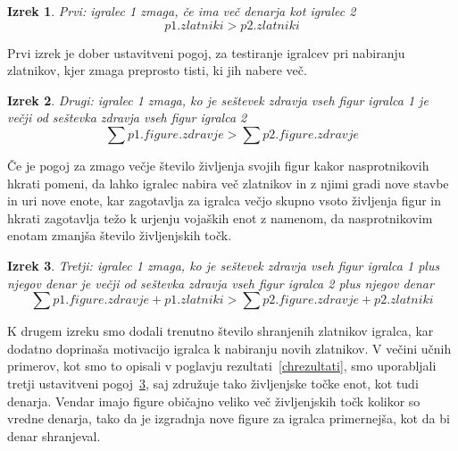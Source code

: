 \documentclass[a4paper, 12pt]{book}
\newtheorem{izrek}{Izrek}[chapter]
\begin{document}
\begin{izrek}
	\label{ustavitvenipogoj1}
Prvi: igralec 1 zmaga, če ima več denarja kot igralec 2
	\begin{equation}
p1.zlatniki > p2.zlatniki
	\label{eq:ustavitvenipogoj1}
	\end{equation}
\end{izrek}

Prvi izrek je dober ustavitveni pogoj, za testiranje igralcev pri nabiranju zlatnikov, kjer zmaga preprosto tisti, ki jih nabere več.

\begin{izrek}
	\label{ustavitvenipogoj2}
Drugi: igralec 1 zmaga, ko je seštevek zdravja vseh figur igralca 1 je večji od seštevka zdravja vseh figur igralca 2
	\begin{equation}
	\sum{p1.figure.zdravje} > \sum{p2.figure.zdravje}
	\label{eq:ustavitvenipogoj2}
	\end{equation}
\end{izrek}

Če je pogoj za zmago večje število življenja svojih figur kakor nasprotnikovih hkrati pomeni, da lahko igralec nabira več zlatnikov in z njimi gradi nove stavbe in uri nove enote, kar zagotavlja za igralca večjo skupno vsoto življenja figur in hkrati zagotavlja težo k urjenju vojaških enot z namenom, da nasprotnikovim enotam zmanjša število življenjskih točk.

\begin{izrek}
	\label{ustavitvenipogoj3}
Tretji: igralec 1 zmaga, ko je seštevek zdravja vseh figur igralca 1 plus njegov denar je večji od seštevka zdravja vseh figur igralca 2 plus njegov denar
	\begin{equation}
	\sum{p1.figure.zdravje} + p1.zlatniki > \sum{p2.figure.zdravje} + p2.zlatniki
	\label{eq:ustavitvenipogoj3}
	\end{equation}
\end{izrek}

K drugem izreku smo dodali trenutno število shranjenih zlatnikov igralca, kar dodatno doprinaša motivacijo igralca k nabiranju novih zlatnikov.
V večini učnih primerov, kot smo to opisali v poglavju rezultati~\ref{chrezultati}, smo uporabljali tretji ustavitveni pogoj~\ref{ustavitvenipogoj3}, saj združuje tako življenjske točke enot, kot tudi denarja.
Vendar imajo figure običajno veliko več življenjskih točk kolikor so vredne denarja, tako da je izgradnja nove figure za igralca primernejša, kot da bi denar shranjeval.

\end{document}

